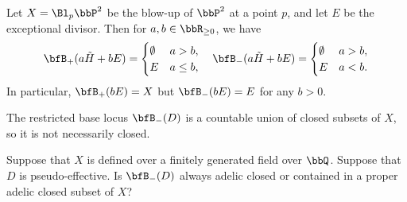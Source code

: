   \begin{example}
    Let $X = \Bl_p \bbP^2$ be the blow-up of $\bbP^2$ at a point $p$, and let $E$ be the exceptional divisor.
    Then for $a,b \in \bbR_{\geq 0}$, we have
    \[ \bfB_+(a\tilde{H} + bE) = \begin{cases}
      \emptyset & a > b, \\
      E & a \leq b,
    \end{cases} \quad \bfB_-(a\tilde{H} + bE) = \begin{cases}
      \emptyset & a > b, \\
      E & a < b.
    \end{cases} \]
    In particular, $\bfB_+(bE) = X$ but $\bfB_-(bE) = E$ for any $b > 0$.
     \Yang{}
  \end{example}

  \begin{remark}
    The restricted base locus $\bfB_-(D)$ is a countable union of closed subsets of $X$, so it is not necessarily closed.
  \end{remark}

  \begin{question}
    Suppose that $X$ is defined over a finitely generated field over $\bbQ$.
    Suppose that $D$ is pseudo-effective.
    Is $\bfB_-(D)$ always adelic closed or contained in a proper adelic closed subset of $X$?
     \Yang{}
  \end{question}

  \begin{example}
    \Yang{}
  \end{example}

